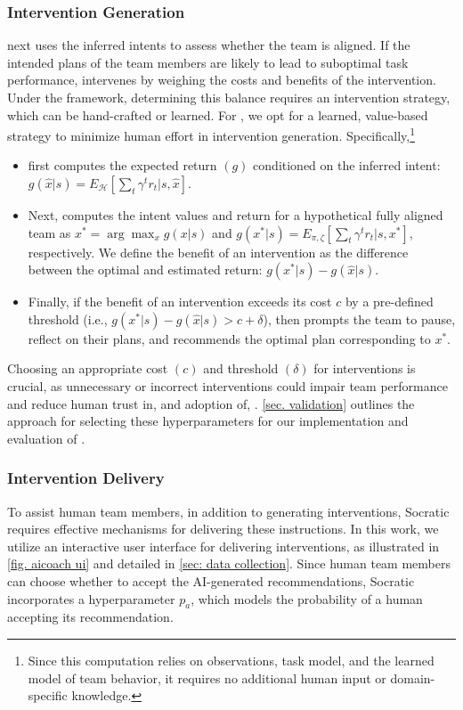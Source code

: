 \subsubsection{Intervention Generation}
\coach next uses the inferred intents to assess whether the team is aligned. If the intended plans of the team members are likely to lead to suboptimal task performance, \coach intervenes by weighing the costs and benefits of the intervention. Under the \tic framework, determining this balance requires an intervention strategy, which can be hand-crafted or learned. For \coach, we opt for a learned, value-based strategy to minimize human effort in intervention generation. Specifically,\footnote{Since this computation relies on observations, task model, and the learned model of team behavior, it requires no additional human input or domain-specific knowledge.}
 \begin{itemize}
    \item \coach first computes the expected return $(g)$ conditioned on the inferred intent: $g(\hat{x}|s) = E_{\mathcal{H}}[\sum_t \gamma^t r_t |s, \hat{x}]$.
    \item Next, \coach computes the intent values and return for a hypothetical fully aligned team as $x^* = \arg\max_{x} g(x|s)$ and $g(x^*|s) = E_{\pi, \zeta}[\sum_t \gamma^t r_t | s, x^*]$, respectively. We define the benefit of an intervention as the difference between the optimal and estimated return: $g(x^*|s) - g(\hat{x}|s)$.
    \item Finally, if the benefit of an intervention exceeds its cost $c$ by a pre-defined threshold (i.e., $g(x^*|s) - g(\hat{x}|s) > c + \delta$), then \coach prompts the team to pause, reflect on their plans, and recommends the optimal plan corresponding to $x^*$.
\end{itemize}
Choosing an appropriate cost $(c)$ and threshold $(\delta)$ for interventions is crucial, as unnecessary or incorrect interventions could impair team performance and reduce human trust in, and adoption of, \coach. 
\cref{sec. validation} outlines the approach for selecting these hyperparameters for our implementation and evaluation of \coach.

\subsubsection{Intervention Delivery}
To assist human team members, in addition to generating interventions, Socratic requires effective mechanisms for delivering these instructions. In this work, we utilize an interactive user interface for delivering interventions, as illustrated in \cref{fig. aicoach ui} and detailed in \cref{sec: data collection}. Since human team members can choose whether to accept the AI-generated recommendations, Socratic incorporates a hyperparameter $p_a$, which models the probability of a human accepting its recommendation.
